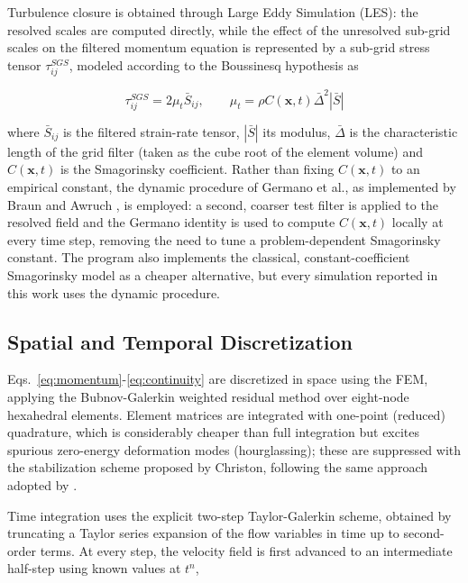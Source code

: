 \documentclass{article}
\begin{document}
Turbulence closure is obtained through Large Eddy Simulation (LES): the resolved scales are computed directly, while the effect of the unresolved sub-grid scales on the filtered momentum equation is represented by a sub-grid stress tensor $\tau_{ij}^{SGS}$, modeled according to the Boussinesq hypothesis as

\begin{equation}
\tau_{ij}^{SGS} = 2\mu_t \bar{S}_{ij}, \qquad \mu_t = \rho C(\mathbf{x},t)\bar{\Delta}^2|\bar{S}|
\label{eq:sgs}
\end{equation}

where $\bar{S}_{ij}$ is the filtered strain-rate tensor, $|\bar{S}|$ its modulus, $\bar{\Delta}$ is the characteristic length of the grid filter (taken as the cube root of the element volume) and $C(\mathbf{x},t)$ is the Smagorinsky coefficient. Rather than fixing $C(\mathbf{x},t)$ to an empirical constant, the dynamic procedure of Germano et al., as implemented by Braun and Awruch \cite{braun09}, is employed: a second, coarser test filter is applied to the resolved field and the Germano identity is used to compute $C(\mathbf{x},t)$ locally at every time step, removing the need to tune a problem-dependent Smagorinsky constant. The program also implements the classical, constant-coefficient Smagorinsky model as a cheaper alternative, but every simulation reported in this work uses the dynamic procedure.

\subsection{Spatial and Temporal Discretization} \label{discretization}

Eqs.~\eqref{eq:momentum}-\eqref{eq:continuity} are discretized in space using the FEM, applying the Bubnov-Galerkin weighted residual method over eight-node hexahedral elements. Element matrices are integrated with one-point (reduced) quadrature, which is considerably cheaper than full integration but excites spurious zero-energy deformation modes (hourglassing); these are suppressed with the stabilization scheme proposed by Christon, following the same approach adopted by \cite{braun09}.

Time integration uses the explicit two-step Taylor-Galerkin scheme, obtained by truncating a Taylor series expansion of the flow variables in time up to second-order terms. At every step, the velocity field is first advanced to an intermediate half-step using known values at $t^n$,
\end{document}
